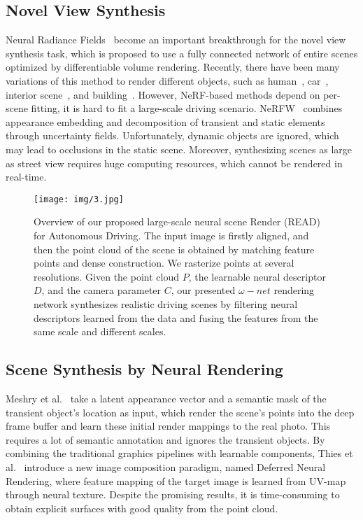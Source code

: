 \documentclass[sigconf]{acmart}
\begin{document}
\subsection{Novel View Synthesis}
Neural Radiance Fields~\cite{mildenhall2020NeRF} become an important breakthrough for the novel view synthesis task, which is proposed to use a fully connected network of entire scenes optimized by differentiable volume rendering. Recently, there have been many variations of this method to render different objects, such as human~\cite{Humannerf}, car~\cite{niemeyer2021giraffe}, interior scene~\cite{wang2021ibrnet}, and building~\cite{martin2021nerf}. However, NeRF-based methods depend on per-scene fitting, it is hard to fit a large-scale driving scenario. NeRFW~\cite{martin2021nerf} combines appearance embedding and decomposition of transient and static elements through uncertainty fields. Unfortunately, dynamic objects are ignored, which may lead to occlusions in the static scene. Moreover, synthesizing scenes as large as street view requires huge computing resources, which cannot be rendered in real-time. 

 \begin{figure*}[t]
  \centering
  \texttt{[image: img/3.jpg]}
  \caption{Overview of our proposed large-scale neural scene Render (READ) for Autonomous Driving. The input image is firstly aligned, and then the point cloud of the scene is obtained by matching feature points and dense construction. We rasterize points at several resolutions. Given the point cloud $P$, the learnable neural descriptor $D$, and the camera parameter $C$, our presented $\omega-net$ rendering network synthesizes realistic driving scenes by filtering neural descriptors learned from the data and fusing the features from the same scale and different scales.}
\label{fig:label2}
\end{figure*}

\subsection{Scene Synthesis by Neural Rendering}
Meshry et al.~\cite{meshry2019neural} take a latent appearance vector and a semantic mask of the transient object's location as input, which render the scene's points into the deep frame buffer and learn these initial render mappings to the real photo. This requires a lot of semantic annotation and ignores the transient objects. By combining the traditional graphics pipelines with learnable components, Thies et al.~\cite{thies2019deferred} introduce a new image composition paradigm, named Deferred Neural Rendering, where feature mapping of the target image is learned from UV-map through neural texture. Despite the promising results, it is time-consuming to obtain explicit surfaces with good quality from the point cloud.
\end{document}
